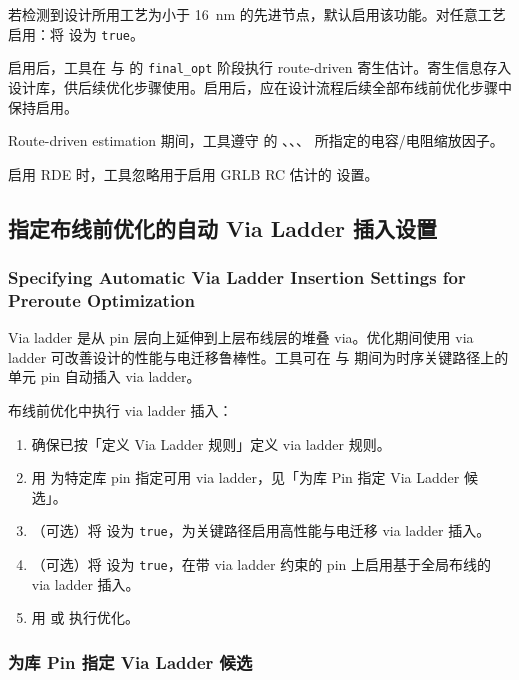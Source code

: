 若检测到设计所用工艺为小于 16~nm 的先进节点，默认启用该功能。对任意工艺启用：将  设为 \texttt{true}。

启用后，工具在  与  的 \texttt{final\_opt} 阶段执行 route-driven 寄生估计。寄生信息存入设计库，供后续优化步骤使用。启用后，应在设计流程后续全部布线前优化步骤中保持启用。

Route-driven estimation 期间，工具遵守  的 、、、 所指定的电容/电阻缩放因子。

启用 RDE 时，工具忽略用于启用 GRLB RC 估计的  设置。

\subsection{指定布线前优化的自动 Via Ladder 插入设置}
\subsubsection*{Specifying Automatic Via Ladder Insertion Settings for Preroute Optimization}

Via ladder 是从 pin 层向上延伸到上层布线层的堆叠 via。优化期间使用 via ladder 可改善设计的性能与电迁移鲁棒性。工具可在  与  期间为时序关键路径上的单元 pin 自动插入 via ladder。

布线前优化中执行 via ladder 插入：
\begin{enumerate}
  \item 确保已按「定义 Via Ladder 规则」定义 via ladder 规则。
  \item 用  为特定库 pin 指定可用 via ladder，见「为库 Pin 指定 Via Ladder 候选」。
  \item （可选）将  设为 \texttt{true}，为关键路径启用高性能与电迁移 via ladder 插入。
  \item （可选）将  设为 \texttt{true}，在带 via ladder 约束的 pin 上启用基于全局布线的 via ladder 插入。
  \item 用  或  执行优化。
\end{enumerate}

\subsubsection{为库 Pin 指定 Via Ladder 候选}
